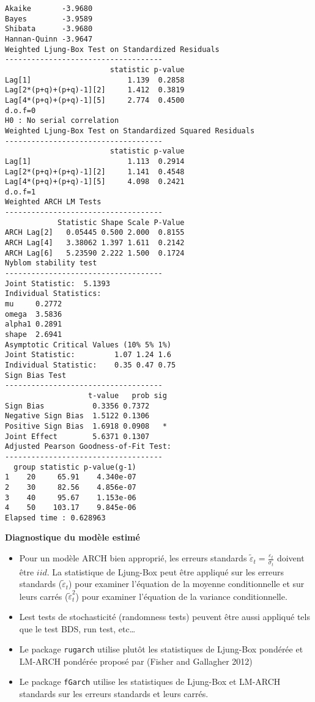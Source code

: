 \documentclass[
  ignorenonframetext,
]{beamer}
\begin{document}
\begin{frame}[fragile]
\begin{verbatim}
Akaike       -3.9680
Bayes        -3.9589
Shibata      -3.9680
Hannan-Quinn -3.9647
Weighted Ljung-Box Test on Standardized Residuals
------------------------------------
                        statistic p-value
Lag[1]                      1.139  0.2858
Lag[2*(p+q)+(p+q)-1][2]     1.412  0.3819
Lag[4*(p+q)+(p+q)-1][5]     2.774  0.4500
d.o.f=0
H0 : No serial correlation
Weighted Ljung-Box Test on Standardized Squared Residuals
------------------------------------
                        statistic p-value
Lag[1]                      1.113  0.2914
Lag[2*(p+q)+(p+q)-1][2]     1.141  0.4548
Lag[4*(p+q)+(p+q)-1][5]     4.098  0.2421
d.o.f=1
Weighted ARCH LM Tests
------------------------------------
            Statistic Shape Scale P-Value
ARCH Lag[2]   0.05445 0.500 2.000  0.8155
ARCH Lag[4]   3.38062 1.397 1.611  0.2142
ARCH Lag[6]   5.23590 2.222 1.500  0.1724
Nyblom stability test
------------------------------------
Joint Statistic:  5.1393
Individual Statistics:             
mu     0.2772
omega  3.5836
alpha1 0.2891
shape  2.6941
Asymptotic Critical Values (10% 5% 1%)
Joint Statistic:         1.07 1.24 1.6
Individual Statistic:    0.35 0.47 0.75
Sign Bias Test
------------------------------------
                   t-value   prob sig
Sign Bias           0.3356 0.7372    
Negative Sign Bias  1.5122 0.1306    
Positive Sign Bias  1.6918 0.0908   *
Joint Effect        5.6371 0.1307    
Adjusted Pearson Goodness-of-Fit Test:
------------------------------------
  group statistic p-value(g-1)
1    20     65.91    4.340e-07
2    30     82.56    4.856e-07
3    40     95.67    1.153e-06
4    50    103.17    9.845e-06
Elapsed time : 0.628963 
\end{verbatim}
\end{frame}
\begin{frame}[fragile]
\textbf{Diagnostique du modèle estimé}
\begin{itemize}[<+->]
\item
  Pour un modèle ARCH bien approprié, les erreurs standards
  \(\widetilde{\varepsilon}_t=\frac{\varepsilon_t}{\sigma_t}\) doivent
  être \(iid\). La statistique de Ljung-Box peut être appliqué sur les
  erreurs standards (\(\widetilde{\varepsilon}_t\)) pour examiner
  l'équation de la moyenne conditionnelle et sur leurs carrés
  (\(\widetilde{\varepsilon}_t^2\)) pour examiner l'équation de la
  variance conditionnelle.
\item
  Lest tests de stochasticité (randomness tests) peuvent être aussi
  appliqué tels que le test BDS, run test, etc\ldots{}
\item
  Le package \texttt{rugarch} utilise plutôt les statistiques de
  Ljung-Box pondérée et LM-ARCH pondérée proposé par (Fisher and
  Gallagher 2012)
\item
  Le package \texttt{fGarch} utilise les statistiques de Ljung-Box et
  LM-ARCH standards sur les erreurs standards et leurs carrés.
\end{itemize}
\end{frame}
\end{document}
